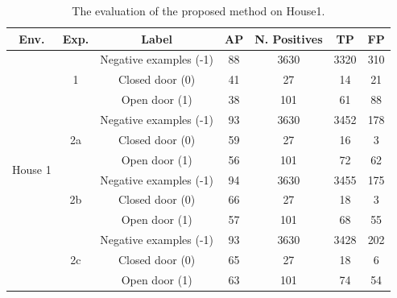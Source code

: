 \begin{table}[h!]
	\centering
	\begin{tabular}{ccccccc}
		
		\toprule
		\textbf{Env.} & \textbf{Exp.} & \textbf{Label} & \textbf{AP} & \textbf{N. Positives} & \textbf{TP} & \textbf{FP} \\
		\midrule
		\multicolumn{1}{c|}{\multirow{12}{*}{House 1}} & \multicolumn{1}{c|}{\multirow{3}{*}{1}} & Negative examples (-1) & 88 & 3630 & 3320 & 310  \tabularnewline 
		\multicolumn{1}{c|}{}& \multicolumn{1}{c|}{} & Closed door (0) & 41 & 27 & 14 & 21  \\
		\multicolumn{1}{c|}{}& \multicolumn{1}{c|}{}& Open door (1) & 38 & 101 & 61 & 88  \\  \cline{2-7}
		\multicolumn{1}{c|}{}& \multicolumn{1}{c|}{\multirow{3}{*}{2a}} & Negative examples (-1) & 93 & 3630 & 3452 & 178  \tabularnewline [1pt]
		\multicolumn{1}{c|}{}& \multicolumn{1}{c|}{} & Closed door (0) & 59 & 27 & 16 & 3  \\ 
		\multicolumn{1}{c|}{}& \multicolumn{1}{c|}{} & Open door (1) & 56 & 101 & 72 & 62   \\ \cline{2-7}
		\multicolumn{1}{c|}{} & \multicolumn{1}{c|}{\multirow{3}{*}{2b}} & Negative examples (-1) & 94 & 3630 & 3455 & 175  \tabularnewline 
		\multicolumn{1}{c|}{}& \multicolumn{1}{c|}{} & Closed door (0) & 66 & 27 & 18 & 3  \\
		\multicolumn{1}{c|}{}& \multicolumn{1}{c|}{}& Open door (1) & 57 & 101 & 68 & 55  \\  \cline{2-7}
		\multicolumn{1}{c|}{}& \multicolumn{1}{c|}{\multirow{3}{*}{2c}} & Negative examples (-1) & 93 & 3630 & 3428 & 202  \tabularnewline [1pt]
		\multicolumn{1}{c|}{}& \multicolumn{1}{c|}{} & Closed door (0) & 65 & 27 & 18 & 6  \\ 
		\multicolumn{1}{c|}{}& \multicolumn{1}{c|}{} & Open door (1) & 63 & 101 & 74 & 54   \\ 
		\bottomrule
	\end{tabular}
	\caption{The evaluation of the proposed method on House1.}
	\label{tab:house_1_results}
\end{table}


